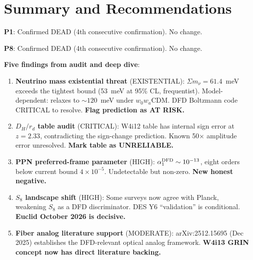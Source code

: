 \documentclass[11pt]{article}
\newcommand{\ee}[1]{\times 10^{#1}}
\begin{document}
\part{Summary and Recommendations}

\begin{tcolorbox}[colback=green!5!white, colframe=green!60!black,
  title=\textbf{W4i14 Summary}]

\textbf{P1}: Confirmed DEAD (4th consecutive confirmation). No change.

\textbf{P8}: Confirmed DEAD (4th consecutive confirmation). No change.

\textbf{Five findings from audit and deep dive}:

\begin{enumerate}[nosep]
\item \textbf{Neutrino mass existential threat} (EXISTENTIAL):
  $\Sigma m_\nu = 61.4$~meV exceeds the tightest bound (53~meV at
  95\% CL, frequentist).  Model-dependent: relaxes to $\sim 120$~meV
  under $w_0 w_a$CDM.  DFD Boltzmann code CRITICAL to resolve.
  \textbf{Flag prediction as AT RISK.}

\item \textbf{$D_H/r_d$ table audit} (CRITICAL): W4i12 table has
  internal sign error at $z = 2.33$, contradicting the sign-change
  prediction.  Known 50$\times$ amplitude error unresolved.
  \textbf{Mark table as UNRELIABLE.}

\item \textbf{PPN preferred-frame parameter} (HIGH): $\alpha_1^{\rm DFD}
  \sim 10^{-13}$, eight orders below current bound $4\ee{-5}$.
  Undetectable but non-zero.  \textbf{New honest negative.}

\item \textbf{$S_8$ landscape shift} (HIGH): Some surveys now agree
  with Planck, weakening $S_8$ as a DFD discriminator.  DES Y6
  ``validation'' is conditional.  \textbf{Euclid October 2026 is
  decisive.}

\item \textbf{Fiber analog literature support} (MODERATE):
  arXiv:2512.15695 (Dec 2025) establishes the DFD-relevant optical
  analog framework.  \textbf{W4i13 GRIN concept now has direct
  literature backing.}
\end{enumerate}

\end{tcolorbox}
\end{document}
